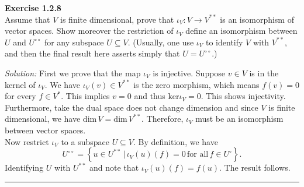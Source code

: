 \documentclass[a4paper, 11pt]{article}
\newenvironment{problem}[2][Exercise]
    { \begin{mdframed}[backgroundcolor=gray!20] \textbf{#1 #2} \\}
    {  \end{mdframed}}
\newenvironment{solution}
    {\textit{Solution:}}
    {}
\begin{document}
\begin{problem}{1.2.8}
Assume that \(V\) is finite dimensional, prove that \(\iota_V:V\rightarrow V^{**}\) is an isomorphism of vector spaces. Show moreover the restriction of \(\iota_V\) define an isomorphism between \(U\) and \(U^{\circ \circ}\) for any subspace \(U\subseteq V\). (Usually, one use \(\iota_V\) to identify \(V\) with \(V^{**}\), and then the final result here asserts simply that \(U=U^{\circ \circ}\).)
    
\end{problem}
\begin{solution}
First we prove that the map \(\iota_V\) is injective. Suppose \(v\in V\) is in the kernel of \(\iota_V\). We have \(\iota_V(v)\in V^{**}\) is the zero morphism, which means \(f(v)=0\) for every \(f\in V^*\). This implies \(v=0\) and thus \(\text{ker}\iota_V=0\). This shows injectivity. Furthermore, take the dual space does not change dimension and since \(V\) is finite dimensional, we have \(\text{dim}\, V=\text{dim}\, V^{**}\). Therefore, \(\iota_V\) must be an isomorphism between vector spaces.
\\
Now restrict \(\iota_V\) to a subspace \(U\subseteq V\). By definition, we have 
$$U^{\circ \circ}=\left\{u\in U^{**}\, |\, \iota_V(u)(f)=0\, \text{for all}\, f\in U^\circ \right\}.$$
Identifying \(U\) with \(U^{**}\) and note that \(\iota_V(u)(f)=f(u)\). The result follows.
\\
\end{solution}
\noindent\rule{7in}{2.8pt}
\end{document}
